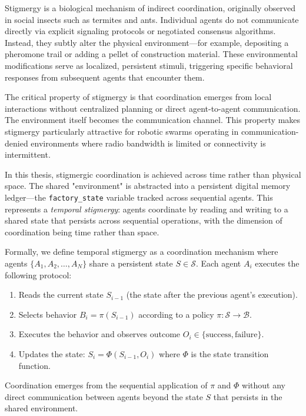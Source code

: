 ﻿\documentclass[12pt,a4paper,oneside]{report}
\begin{document}
Stigmergy is a biological mechanism of indirect coordination, originally observed in social insects such as termites and ants. Individual agents do not communicate directly via explicit signaling protocols or negotiated consensus algorithms. Instead, they subtly alter the physical environment---for example, depositing a pheromone trail or adding a pellet of construction material. These environmental modifications serve as localized, persistent stimuli, triggering specific behavioral responses from subsequent agents that encounter them.

The critical property of stigmergy is that coordination emerges from local interactions without centralized planning or direct agent-to-agent communication. The environment itself becomes the communication channel. This property makes stigmergy particularly attractive for robotic swarms operating in communication-denied environments where radio bandwidth is limited or connectivity is intermittent.

In this thesis, stigmergic coordination is achieved across time rather than physical space. The shared "environment" is abstracted into a persistent digital memory ledger---the \texttt{factory\_state} variable tracked across sequential agents. This represents a \textit{temporal stigmergy}: agents coordinate by reading and writing to a shared state that persists across sequential operations, with the dimension of coordination being time rather than space.

Formally, we define temporal stigmergy as a coordination mechanism where agents $\{A_1, A_2, \ldots, A_N\}$ share a persistent state $S \in \mathcal{S}$. Each agent $A_i$ executes the following protocol:

\begin{enumerate}
    \item Reads the current state $S_{i-1}$ (the state after the previous agent's execution).
    \item Selects behavior $B_i = \pi(S_{i-1})$ according to a policy $\pi: \mathcal{S} \rightarrow \mathcal{B}$.
    \item Executes the behavior and observes outcome $O_i \in \{\text{success}, \text{failure}\}$.
    \item Updates the state: $S_i = \Phi(S_{i-1}, O_i)$ where $\Phi$ is the state transition function.
\end{enumerate}

Coordination emerges from the sequential application of $\pi$ and $\Phi$ without any direct communication between agents beyond the state $S$ that persists in the shared environment.
\end{document}
